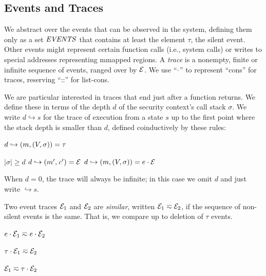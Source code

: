 \documentclass[10pt,conference]{ieeetran}%
\theoremstyle{definition}
\begin{document}
\subsection{Events and Traces}
\label{sec:events}

We abstract over the events that can be observed in the system, defining them
only as a set \(\mathit{EVENTS}\) that contains at least the element \(\tau\), the silent
event. Other events might represent certain function calls (i.e., system calls)
or writes to special addresses representing mmapped regions.
A {\em trace} is a nonempty, finite or infinite sequence
of events, ranged over by \(\mathcal{E}\).
We use ``\(\cdot\)'' to represent ``cons'' for traces, reserving ``::''
for list-cons.

We are particular interested in traces that end just after a function returns.
We define these in terms of the depth \(d\) of the security context's call stack \(\sigma\).
We write \(d \hookrightarrow s\) for the trace of execution from a state \(s\)
up to the first point where the stack depth is smaller than \(d\), defined
coinductively by these rules:

         {\(d \hookrightarrow (m,(V,\sigma)) = \tau\)}

              {\(|\sigma| \geq d\)}
              {\(d \hookrightarrow (m',\mathit{c}') = \mathcal{E}\)}
              {\(d \hookrightarrow (m,(V,\sigma)) = e \cdot \mathcal{E}\)}

\noindent
When \(d = 0\), the trace will always be infinite; in this case we
omit \(d\) and just write \(\hookrightarrow s\).

Two event traces $\mathcal{E}_1$ and $\mathcal{E}_2$ are {\em similar},
written \(\mathcal{E}_1 \eqsim \mathcal{E}_2\), if the sequence of non-silent events
is the same. That is, we compare up to deletion of \(\tau\) events.

\begin{minipage}{.4\columnwidth}
  \judgment{}{\(\obsT \eqsim \obsT\)}
\end{minipage}
\begin{minipage}{.4\columnwidth}
           {\(e \cdot \mathcal{E}_1 \eqsim e \cdot \mathcal{E}_2\)}
\end{minipage}

\begin{minipage}{.4\columnwidth}
           {\(\tau \cdot \mathcal{E}_1 \eqsim \mathcal{E}_2\)}
\end{minipage}
\begin{minipage}{.4\columnwidth}
           {\(\mathcal{E}_1 \eqsim \tau \cdot \mathcal{E}_2\)}
\end{minipage}
\end{document}
